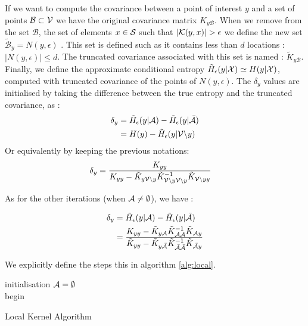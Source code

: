 \documentclass[12pt,twoside]{report}
\begin{document}
If we want to compute the covariance between a point of interest $y$ and a set of points $\mathcal{B} \subset \V $ we have the original covariance matrix $K_{y\mathcal{B}}$. When we remove from the set $\mathcal{B}$, the set of elements  $x \in \S$ such that $|\K(y,x)| > \epsilon $ we define the new set  $\tilde{\mathcal{B}}_y = N(y,\epsilon)$ . This set is defined such as it contains less than $d$ locations : $|N(y,\epsilon)| \leq d $. The truncated covariance associated with this set is named : $\tilde{K}_{y\mathcal{B}}$. Finally, we define the approximate conditional entropy $\tilde{H}_\epsilon(y | \X) \simeq H(y | \X)$, computed with truncated covariance of the points of $N(y,\epsilon)$. The $\delta_y$ values are initialised by taking the difference between the true entropy and the truncated covariance, as :
\begin{align}
	\delta_y &= \tilde{H}_\epsilon(y | \A) - \tilde{H}_\epsilon(y | \bar{\A}) \\
			&= H(y) - \tilde{H}_\epsilon(y | \V \backslash y )
\end{align}
Or equivalently by keeping the previous notations: 
\begin{align}
	\delta_y &= \frac{K_{yy} }{K_{yy} - \tilde{K}_{y\V \backslash y} \tilde{K}_{\V \backslash y \V \backslash y}^{-1} \tilde{K}_{\V \backslash y y} } \label{equ:initLocal}
\end{align}


As for the other iterations (when $\A \neq \emptyset$), we have : 

\begin{align}
	\delta_y &= \tilde{H}_\epsilon(y | \A) - \tilde{H}_\epsilon(y | \bar{\A}) \\
	&= \frac{K_{yy} - \tilde{K}_{y\A} \tilde{K}_{\A\A}^{-1} \tilde{K}_{\A y} }{\tilde{K}_{yy} - \tilde{K}_{y\bar{\A}} \tilde{K}_{\bar{\A}\bar{\A}}^{-1} \tilde{K}_{\bar{\A} y} } \label{equ:updateLocal}
\end{align}


We explicitly define the steps  this in algorithm \ref{alg:local}. \\

\begin{algorithm}[h]
 initialisation\;
 $\A = \emptyset$ \\
 begin\;
\caption{Local Kernel Algorithm}
\label{alg:local}
\end{algorithm} 
\end{document}
